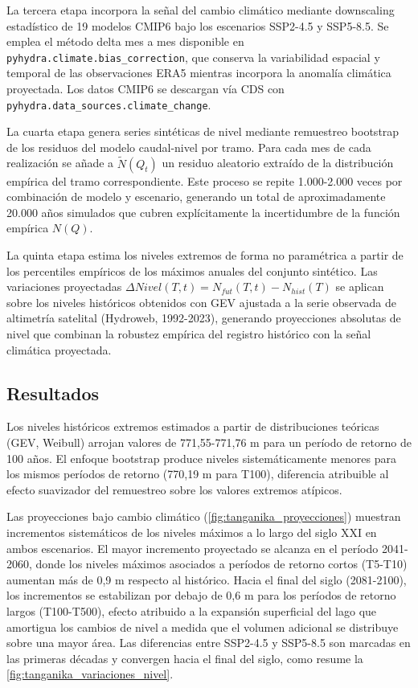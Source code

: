 La tercera etapa incorpora la señal del cambio climático mediante downscaling estadístico de 19 modelos CMIP6 bajo los escenarios SSP2-4.5 y SSP5-8.5. Se emplea el método delta mes a mes disponible en \texttt{pyhydra.climate.bias\_correction}, que conserva la variabilidad espacial y temporal de las observaciones ERA5 mientras incorpora la anomalía climática proyectada. Los datos CMIP6 se descargan vía CDS con \texttt{pyhydra.data\_sources.climate\_change}.

La cuarta etapa genera series sintéticas de nivel mediante remuestreo bootstrap de los residuos del modelo caudal-nivel por tramo. Para cada mes de cada realización se añade a $\tilde{N}(Q_t)$ un residuo aleatorio extraído de la distribución empírica del tramo correspondiente. Este proceso se repite 1.000-2.000 veces por combinación de modelo y escenario, generando un total de aproximadamente 20.000 años simulados que cubren explícitamente la incertidumbre de la función empírica $N(Q)$.

La quinta etapa estima los niveles extremos de forma no paramétrica a partir de los percentiles empíricos de los máximos anuales del conjunto sintético. Las variaciones proyectadas $\Delta Nivel(T, t) = N_{fut}(T, t) - N_{hist}(T)$ se aplican sobre los niveles históricos obtenidos con GEV ajustada a la serie observada de altimetría satelital (Hydroweb, 1992-2023), generando proyecciones absolutas de nivel que combinan la robustez empírica del registro histórico con la señal climática proyectada.

\subsection{Resultados}

Los niveles históricos extremos estimados a partir de distribuciones teóricas (GEV, Weibull) arrojan valores de 771,55-771,76 m para un período de retorno de 100 años. El enfoque bootstrap produce niveles sistemáticamente menores para los mismos períodos de retorno (770,19 m para T100), diferencia atribuible al efecto suavizador del remuestreo sobre los valores extremos atípicos.

Las proyecciones bajo cambio climático (\cref{fig:tanganika_proyecciones}) muestran incrementos sistemáticos de los niveles máximos a lo largo del siglo XXI en ambos escenarios. El mayor incremento proyectado se alcanza en el período 2041-2060, donde los niveles máximos asociados a períodos de retorno cortos (T5-T10) aumentan más de 0,9 m respecto al histórico. Hacia el final del siglo (2081-2100), los incrementos se estabilizan por debajo de 0,6 m para los períodos de retorno largos (T100-T500), efecto atribuido a la expansión superficial del lago que amortigua los cambios de nivel a medida que el volumen adicional se distribuye sobre una mayor área. Las diferencias entre SSP2-4.5 y SSP5-8.5 son marcadas en las primeras décadas y convergen hacia el final del siglo, como resume la \cref{fig:tanganika_variaciones_nivel}.

